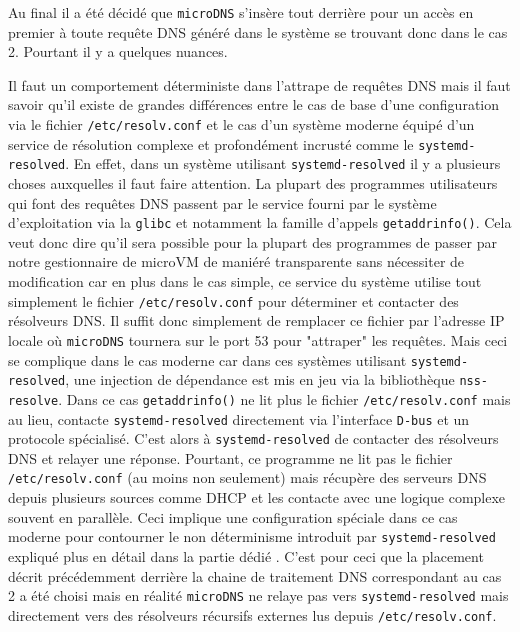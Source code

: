 \documentclass[12pt]{article}
\begin{document}
Au final il a été décidé que \texttt{microDNS} s'insère tout derrière pour un accès en premier à toute requête DNS généré dans le système se trouvant donc dans le cas 2. Pourtant il y a quelques nuances.

Il faut un comportement déterministe dans l'attrape de requêtes DNS mais il faut savoir qu'il existe de grandes différences entre le cas de base d'une configuration via le fichier \texttt{/etc/resolv.conf} et le cas d'un système moderne équipé d'un service de résolution complexe et profondément incrusté comme le \texttt{systemd-resolved}. En effet, dans un système utilisant \texttt{systemd-resolved} il y a plusieurs choses auxquelles il faut faire attention. La plupart des programmes utilisateurs qui font des requêtes DNS passent par le service fourni par le système d'exploitation via la \texttt{glibc} et notamment la famille d'appels \lstinline|getaddrinfo()|. Cela veut donc dire qu'il sera possible pour la plupart des programmes de passer par notre gestionnaire de microVM de maniéré transparente sans nécessiter de modification car en plus dans le cas simple, ce service du système utilise tout simplement le fichier \texttt{/etc/resolv.conf} pour déterminer et contacter des résolveurs DNS. Il suffit donc simplement de remplacer ce fichier par l'adresse IP locale où \texttt{microDNS} tournera sur le port 53 pour "attraper" les requêtes. Mais ceci se complique dans le cas moderne car dans ces systèmes utilisant \texttt{systemd-resolved}, une injection de dépendance est mis en jeu via la bibliothèque \texttt{nss-resolve}. Dans ce cas \lstinline|getaddrinfo()| ne lit plus le fichier \texttt{/etc/resolv.conf} mais au lieu, contacte \texttt{systemd-resolved} directement via l'interface \texttt{D-bus} et un protocole spécialisé. C'est alors à \texttt{systemd-resolved} de contacter des résolveurs DNS et relayer une réponse. Pourtant, ce programme ne lit pas le fichier \texttt{/etc/resolv.conf} (au moins non seulement) mais récupère des serveurs DNS depuis plusieurs sources comme DHCP et les contacte avec une logique complexe souvent en parallèle. Ceci implique une configuration spéciale dans ce cas moderne pour contourner le non déterminisme introduit par \texttt{systemd-resolved} expliqué plus en détail dans la partie dédié . C'est pour ceci que la placement décrit précédemment derrière la chaine de traitement DNS correspondant au cas 2 a été choisi mais en réalité \texttt{microDNS} ne relaye pas vers \texttt{systemd-resolved} mais directement vers des résolveurs récursifs externes lus depuis \texttt{/etc/resolv.conf}.
\end{document}
